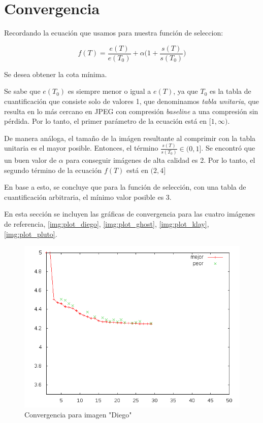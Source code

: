 \section{Convergencia}

Recordando la ecuación que usamos para nuestra función de seleccion:

\begin{equation}
f(T) = \frac{e(T)}{e(T_0)} + \alpha \Big(1 + \frac{s(T)}{s(T_0)}\Big)
\end{equation}\label{eq:fitness-repeated}

Se desea obtener la cota mínima.

Se sabe que $e(T_0)$ es siempre menor o igual a $e(T)$, ya que $T_0$ es la
tabla de cuantificación que consiste solo de valores 1, que denominamos
\emph{tabla unitaria}, que resulta en lo más cercano en JPEG con compresión
\emph{baseline} a una compresión sin pérdida. Por lo tanto, el primer parámetro
de la ecuación está en $[1, \infty)$.

De manera análoga, el tamaño de la imágen resultante al comprimir con la tabla
unitaria es el mayor posible. Entonces, el término $\frac{s(T)}{s(T_0)} \in (0,
1]$. Se encontró que un buen valor de $\alpha$ para conseguir imágenes de alta
calidad es 2. Por lo tanto, el segundo término de la ecuación $f(T)$ está en
$(2, 4]$

En base a esto, se concluye que para la función de selección, con una tabla de
cuantificación arbitraria, el mínimo valor posible es 3.

En esta sección se incluyen las gráficas de convergencia para las cuatro
imágenes de referencia, \ref{img:plot_diego}, \ref{img:plot_ghost},
\ref{img:plot_klay}, \ref{img:plot_pluto}.


\begin{figure}[h]\label{img:plot_diego}
    \includegraphics[width=1.0\textwidth]{plot_diego}
    \caption{Convergencia para imagen "Diego"}
    \label{fig:huffman}
\end{figure}

